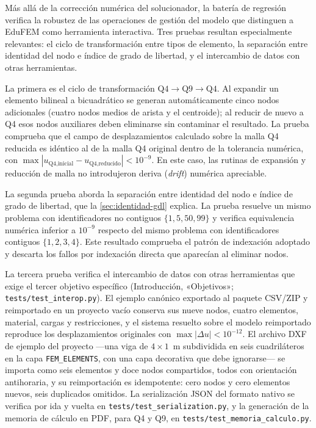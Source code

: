 Más allá de la corrección numérica del solucionador, la batería de regresión verifica la robustez de las operaciones de gestión del modelo que distinguen a EduFEM como herramienta interactiva. Tres pruebas resultan especialmente relevantes: el ciclo de transformación entre tipos de elemento, la separación entre identidad del nodo e índice de grado de libertad, y el intercambio de datos con otras herramientas.

La primera es el ciclo de transformación $\text{Q4}\rightarrow\text{Q9}\rightarrow\text{Q4}$. Al expandir un elemento bilineal a bicuadrático se generan automáticamente cinco nodos adicionales (cuatro nodos medios de arista y el centroide); al reducir de nuevo a Q4 esos nodos auxiliares deben eliminarse sin contaminar el resultado. La prueba comprueba que el campo de desplazamientos calculado sobre la malla Q4 reducida es idéntico al de la malla Q4 original dentro de la tolerancia numérica, con $\max|u_{\text{Q4,inicial}} - u_{\text{Q4,reducido}}| < 10^{-9}$. En este caso, las rutinas de expansión y reducción de malla no introdujeron deriva (\emph{drift}) numérica apreciable.

La segunda prueba aborda la separación entre identidad del nodo e índice de grado de libertad, que la \autoref{sec:identidad-gdl} explica. La prueba resuelve un mismo problema con identificadores no contiguos $\{1,5,50,99\}$ y verifica equivalencia numérica inferior a $10^{-9}$ respecto del mismo problema con identificadores contiguos $\{1,2,3,4\}$. Este resultado comprueba el patrón de indexación adoptado y descarta los fallos por indexación directa que aparecían al eliminar nodos.

La tercera prueba verifica el intercambio de datos con otras herramientas que exige el tercer objetivo específico (Introducción, «Objetivos»; \texttt{tests/test\_interop.py}). El ejemplo canónico exportado al paquete CSV/ZIP y reimportado en un proyecto vacío conserva sus nueve nodos, cuatro elementos, material, cargas y restricciones, y el sistema resuelto sobre el modelo reimportado reproduce los desplazamientos originales con $\max|\Delta u| < 10^{-12}$. El archivo DXF de ejemplo del proyecto —una viga de $4\times1$~m subdividida en seis cuadriláteros en la capa \texttt{FEM\_ELEMENTS}, con una capa decorativa que debe ignorarse— se importa como seis elementos y doce nodos compartidos, todos con orientación antihoraria, y su reimportación es idempotente: cero nodos y cero elementos nuevos, seis duplicados omitidos. La serialización JSON del formato nativo se verifica por ida y vuelta en \texttt{tests/test\_serialization.py}, y la generación de la memoria de cálculo en PDF, para Q4 y Q9, en \texttt{tests/test\_memoria\_calculo.py}.

